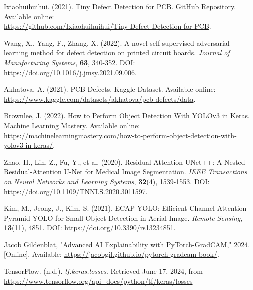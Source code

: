 \documentclass[12pt]{article}
\begin{document}
\begin{thebibliography}{10} 
    Ixiaohuihuihui. (2021). Tiny Defect Detection for PCB. GitHub Repository. Available online: \\\url{https://github.com/Ixiaohuihuihui/Tiny-Defect-Detection-for-PCB}.
    
    Wang, X., Yang, F., Zhang, X. (2022). A novel self-supervised adversarial learning method for defect detection on printed circuit boards. \textit{Journal of Manufacturing Systems}, \textbf{63}, 340-352. DOI: \url{https://doi.org/10.1016/j.jmsy.2021.09.006}.
    
    Akhatova, A. (2021). PCB Defects. Kaggle Dataset. Available online: \url{https://www.kaggle.com/datasets/akhatova/pcb-defects/data}.
    
    Brownlee, J. (2022). How to Perform Object Detection With YOLOv3 in Keras. Machine Learning Mastery. Available online: \url{https://machinelearningmastery.com/how-to-perform-object-detection-with-yolov3-in-keras/}.
    
    Zhao, H., Lin, Z., Fu, Y., et al. (2020). Residual-Attention UNet++: A Nested Residual-Attention U-Net for Medical Image Segmentation. \textit{IEEE Transactions on Neural Networks and Learning Systems}, \textbf{32}(4), 1539-1553. DOI: \url{https://doi.org/10.1109/TNNLS.2020.3011597}.

    Kim, M., Jeong, J., Kim, S. (2021). ECAP-YOLO: Efficient Channel Attention Pyramid YOLO for Small Object Detection in Aerial Image. \textit{Remote Sensing}, \textbf{13}(11), 4851. DOI: \url{https://doi.org/10.3390/rs13234851}.

    Jacob Gildenblat, "Advanced AI Explainability with PyTorch-GradCAM," 2024. [Online]. Available: \url{https://jacobgil.github.io/pytorch-gradcam-book/}.

    TensorFlow. (n.d.). \textit{tf.keras.losses}. Retrieved June 17, 2024, from \url{https://www.tensorflow.org/api_docs/python/tf/keras/losses}


    
\end{thebibliography}

\clearpage
\newpage
\end{document}
